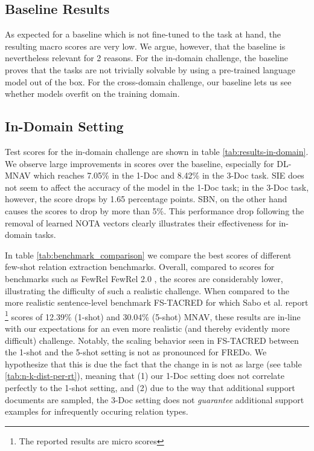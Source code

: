 \documentclass[11pt]{article}
\begin{document}
\subsection{Baseline Results}
As expected for a baseline which is not fine-tuned to the task at hand, the resulting macro  scores are very low.
We argue, however, that the baseline is nevertheless relevant for 2 reasons. 
For the in-domain challenge, the baseline proves that the tasks are not trivially solvable by using a pre-trained language model out of the box.
For the cross-domain challenge, our baseline lets us see whether models overfit on the training domain.


\subsection{In-Domain Setting}



Test scores for the in-domain challenge are shown in table \ref{tab:results-in-domain}.
We observe large improvements in  scores over the baseline, especially for DL-MNAV which reaches 7.05\% in the 1-Doc and 8.42\% in the 3-Doc task.
SIE does not seem to affect the accuracy of the model in the 1-Doc task; in the 3-Doc task, however, the  score drops by 1.65 percentage points.
SBN, on the other hand causes the  scores to drop by more than 5\%.
This performance drop following the removal of learned NOTA vectors clearly illustrates their effectiveness for in-domain tasks.


In table \ref{tab:benchmark_comparison} we compare the best  scores of different few-shot relation extraction benchmarks.
Overall, compared to scores for benchmarks such as FewRel \cite{han_fewrel_2018} FewRel 2.0 \cite{gao_fewrel_2019}, the  scores are considerably lower, illustrating the difficulty of such a realistic challenge.
When compared to the more realistic sentence-level benchmark FS-TACRED \cite{sabo_revisiting_2021} for which Sabo et al. report \footnote{The reported results are micro  scores} scores of 12.39\% (1-shot) and 30.04\% (5-shot) MNAV, these results are in-line with our expectations for an even more realistic (and thereby evidently more difficult) challenge.
Notably, the scaling behavior seen in FS-TACRED between the 1-shot and the 5-shot setting is not as pronounced for FREDo. We hypothesize that this is due the fact that the change in  is not as large (see table \ref{tab:n-k-dist-per-rt}), meaning that (1) our 1-Doc setting does not correlate perfectly to the 1-shot setting, and (2) due to the way that additional support documents are sampled, the 3-Doc setting does not \textit{guarantee} additional support examples for infrequently occuring relation types.
\end{document}
